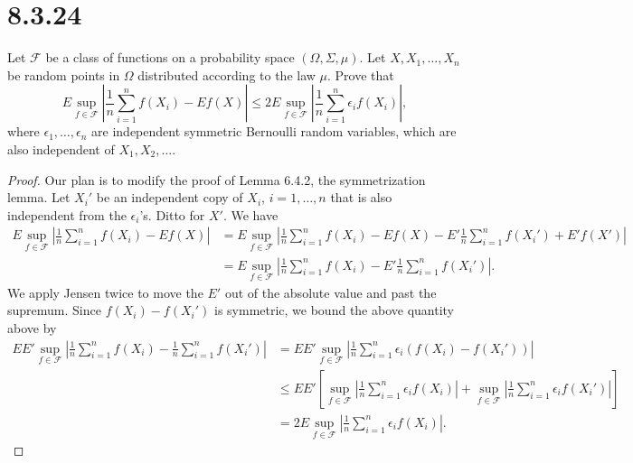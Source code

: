 \documentclass[11pt,letterpaper]{report}
\newcommand{\mcal}[1]{\mathcal{#1}}
\begin{document}
\section*{8.3.24}
Let $\mcal{F}$ be a class of functions on a probability space $(\Omega, \Sigma, \mu)$. Let $X, X_1, \ldots, X_n$ be random points in $\Omega$ distributed according to the law $\mu$. Prove that
\[
E\sup_{f\in \mcal{F}}\left|\frac{1}{n}\sum_{i=1}^nf(X_i)-Ef(X)\right|\leq 2E\sup_{f\in \mcal{F}}\left|\frac{1}{n}\sum_{i=1}^n\epsilon_if(X_i)\right|,
\]
where $\epsilon_1, \ldots, \epsilon_n$ are independent symmetric Bernoulli random variables, which are also independent of $X_1, X_2, \ldots$.
\begin{proof}
	Our plan is to modify the proof of Lemma 6.4.2, the symmetrization lemma. Let $X_i'$ be an independent copy of $X_i$, $i=1, \ldots, n$ that is also independent from the $\epsilon_i$'s. Ditto for $X'$. We have
	\begin{align*}
		E\sup_{f\in \mcal{F}}\left|\frac{1}{n}\sum_{i=1}^nf(X_i)-Ef(X)\right| &= E\sup_{f\in \mcal{F}}\left|\frac{1}{n}\sum_{i=1}^nf(X_i)-Ef(X)-E'\frac{1}{n}\sum_{i=1}^nf(X_i')+E'f(X')\right|\\
		&= E\sup_{f\in \mcal{F}}\left|\frac{1}{n}\sum_{i=1}^nf(X_i)-E'\frac{1}{n}\sum_{i=1}^nf(X_i')\right|.
	\end{align*}
	We apply Jensen twice to move the $E'$ out of the absolute value and past the supremum. Since $f(X_i)-f(X_i')$ is symmetric, we bound the above quantity above by
	\begin{align*}
		EE'\sup_{f\in \mcal{F}}\left|\frac{1}{n}\sum_{i=1}^nf(X_i)-\frac{1}{n}\sum_{i=1}^nf(X_i')\right| &= EE'\sup_{f\in \mcal{F}}\left|\frac{1}{n}\sum_{i=1}^n\epsilon_i(f(X_i)-f(X_i'))\right|\\
		&\leq EE'\left[\sup_{f\in \mcal{F}}\left|\frac{1}{n}\sum_{i=1}^n\epsilon_if(X_i)\right| + \sup_{f\in \mcal{F}}\left|\frac{1}{n}\sum_{i=1}^n\epsilon_if(X_i')\right|\right]\\
		&= 2E\sup_{f\in \mcal{F}}\left|\frac{1}{n}\sum_{i=1}^n\epsilon_if(X_i)\right|.
	\end{align*}
\end{proof}
\end{document}
